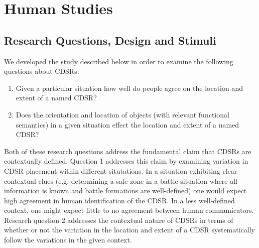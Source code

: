\documentclass[11pt,letterpaper]{article}
\begin{document}
\section{Human Studies}

\subsection{Research Questions, Design and Stimuli}

We developed the study described below in order to examine the following questions about CDSRs:
\begin{enumerate}
	\item Given a particular situation how well do people agree on the location and extent of a named CDSR?
	\item Does the orientation and location of objects (with relevant functional semantics) in a given situation effect the location and extent of a named CDSR?
\end{enumerate}

Both of these research questions address the fundamental claim that CDSRs are contextually defined. Question 1 addresses this claim by examining variation in CDSR placement within different situtations. In a situation exhibiting clear contextual clues (e.g. determining a safe zone in a battle situation where all information is known and battle formations are well-defined) one would expect high agreement in human identification of the CDSR. In a less well-defined context, one might expect little to no agreement between human communicators.  Research question 2 addresses the contextual nature of CDSRs in terms of whether or not the variation in the location and extent of a CDSR systematically follow the variations  in the given context. 

\end{document}
